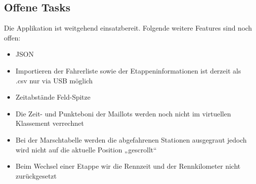 \subsection{Offene Tasks}
Die Applikation ist weitgehend einsatzbereit. Folgende weitere Features sind noch offen:
\begin{itemize}
\item JSON
\item Importieren der Fahrerliste sowie der Etappeninformationen ist derzeit als .csv nur via USB möglich
\item Zeitabstände Feld-Spitze
\item Die Zeit- und Punkteboni der Maillots werden noch nicht im virtuellen Klassement verrechnet
\item Bei der Marschtabelle werden die abgefahrenen Stationen ausgegraut jedoch wird nicht auf die aktuelle Position „gescrollt“
\item Beim Wechsel einer Etappe wir die Rennzeit und der Rennkilometer nicht zurückgesetzt
\end{itemize}
